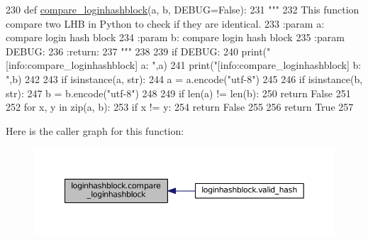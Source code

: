 \begin{DoxyCode}
230 \textcolor{keyword}{def }\hyperlink{namespaceloginhashblock_ac24dd842eb90e0ede55e842d44148d5b}{compare\_loginhashblock}(a, b, DEBUG=False):
231     \textcolor{stringliteral}{"""}
232 \textcolor{stringliteral}{    This function compare two LHB in Python to check if they are identical.}
233 \textcolor{stringliteral}{    :param a: compare login hash block}
234 \textcolor{stringliteral}{    :param b: compare login hash block}
235 \textcolor{stringliteral}{    :param DEBUG:}
236 \textcolor{stringliteral}{    :return:}
237 \textcolor{stringliteral}{    """}
238 
239     \textcolor{keywordflow}{if} DEBUG:
240         print(\textcolor{stringliteral}{"[info:compare\_loginhashblock] a: "},a)
241         print(\textcolor{stringliteral}{"[info:compare\_loginhashblock] b: "},b)
242 
243     \textcolor{keywordflow}{if} isinstance(a, str):
244         a = a.encode(\textcolor{stringliteral}{"utf-8"})
245 
246     \textcolor{keywordflow}{if} isinstance(b, str):
247         b = b.encode(\textcolor{stringliteral}{"utf-8"})
248 
249     \textcolor{keywordflow}{if} len(a) != len(b):
250         \textcolor{keywordflow}{return} \textcolor{keyword}{False}
251 
252     \textcolor{keywordflow}{for} x, y \textcolor{keywordflow}{in} zip(a, b):
253         \textcolor{keywordflow}{if} x != y:
254             \textcolor{keywordflow}{return} \textcolor{keyword}{False}
255 
256     \textcolor{keywordflow}{return} \textcolor{keyword}{True}
257 
\end{DoxyCode}


Here is the caller graph for this function\+:
\nopagebreak
\begin{figure}[H]
\begin{center}
\leavevmode
\includegraphics[width=350pt]{namespaceloginhashblock_ac24dd842eb90e0ede55e842d44148d5b_icgraph}
\end{center}
\end{figure}



